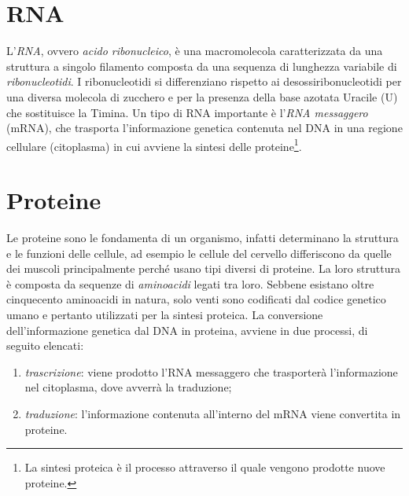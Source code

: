 \section{RNA}
L'\textit{RNA}, ovvero \textit{acido ribonucleico}, è una macromolecola caratterizzata da una struttura a singolo filamento composta da una sequenza di lunghezza variabile di \textit{ribonucleotidi}.
\newline
I ribonucleotidi si differenziano rispetto ai desossiribonucleotidi per una diversa molecola di zucchero e per la presenza della base azotata Uracile (U) che sostituisce la Timina.
\newline
Un tipo di RNA importante è l'\textit{RNA messaggero} (mRNA), che trasporta l'informazione genetica contenuta nel DNA in una regione cellulare (citoplasma) in cui avviene la sintesi delle proteine\footnote{La sintesi proteica è il processo attraverso il quale vengono prodotte nuove proteine.}.

\section{Proteine}
Le proteine sono le fondamenta di un organismo, infatti determinano la struttura e le funzioni delle cellule, ad esempio le cellule del cervello differiscono da quelle dei muscoli principalmente perché usano tipi diversi di proteine.
La loro struttura è composta da sequenze di \textit{aminoacidi} legati tra loro.
\newline
Sebbene esistano oltre cinquecento aminoacidi in natura, solo venti sono codificati dal codice genetico umano e pertanto utilizzati per la sintesi proteica.
\newline
La conversione dell'informazione genetica dal DNA in proteina, avviene in due processi, di seguito elencati:
\begin{enumerate}
	\item \textit{trascrizione}: viene prodotto l'RNA messaggero che trasporterà l'informazione nel citoplasma, dove avverrà la traduzione;
	\item \textit{traduzione}: l'informazione contenuta all'interno del mRNA viene convertita in proteine.
\end{enumerate}